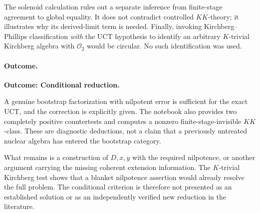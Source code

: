 \documentclass[11pt,a4paper]{article}
\begin{document}
The solenoid calculation rules out a separate inference from finite-stage
agreement to global equality. It does not contradict controlled
$KK$-theory; it illustrates why its derived-limit term is needed.
Finally, invoking Kirchberg--Phillips classification \emph{with} the UCT
hypothesis to identify an arbitrary $K$-trivial Kirchberg algebra with
$\mathcal O_2$ would be circular. No such identification was used.

\paragraph{Outcome.}
\textbf{Outcome: Conditional reduction.}

A genuine bootstrap factorization with nilpotent error is sufficient for
the exact UCT, and the correction is explicitly given. The notebook also
provides two completely positive countertests and computes a nonzero
finite-stage-invisible $KK$-class. These are diagnostic deductions, not a
claim that a previously untreated nuclear algebra has entered the
bootstrap category.

What remains is a construction of $D,x,y$ with the required nilpotence,
or another argument carrying the missing coherent extension information.
The $K$-trivial Kirchberg test shows that a blanket nilpotence assertion
would already resolve the full problem. The conditional criterion is
therefore not presented as an established solution or as an independently
verified new reduction in the literature.

\end{document}
